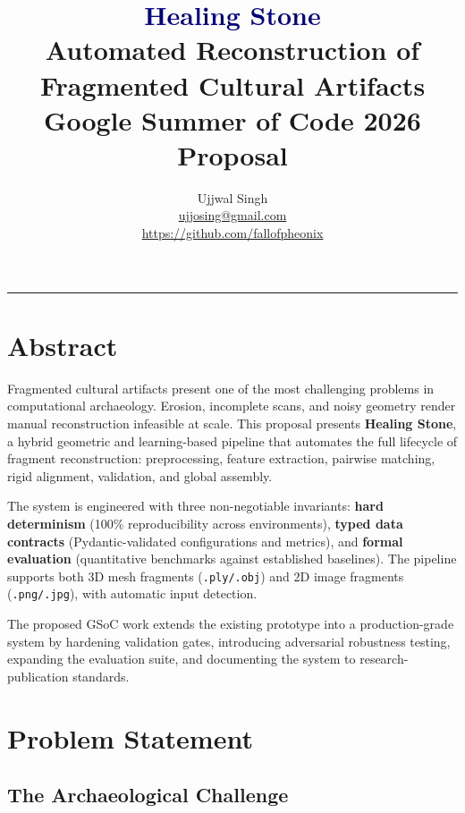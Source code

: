 \documentclass[11pt,a4paper]{article}
\title{
    \vspace{-1cm}
    {\Huge\textbf{\textcolor{navy}{Healing Stone}}} \\[0.3cm]
    {\Large Automated Reconstruction of Fragmented Cultural Artifacts} \\[0.3cm]
    {\large Google Summer of Code 2026 Proposal}
}
\author{
    Ujjwal Singh \\
    \href{mailto:ujjosing@gmail.com}{ujjosing@gmail.com} \\
    \url{https://github.com/fallofpheonix}
}
\date{}
\begin{document}
\maketitle
\thispagestyle{fancy}

\vspace{-0.5cm}
\begin{center}
\rule{0.8\textwidth}{0.5pt}
\end{center}

\tableofcontents
\newpage

\section{Abstract}

Fragmented cultural artifacts present one of the most challenging problems in computational archaeology. Erosion, incomplete scans, and noisy geometry render manual reconstruction infeasible at scale. This proposal presents \textbf{Healing Stone}, a hybrid geometric and learning-based pipeline that automates the full lifecycle of fragment reconstruction: preprocessing, feature extraction, pairwise matching, rigid alignment, validation, and global assembly.

The system is engineered with three non-negotiable invariants: \textbf{hard determinism} (100\% reproducibility across environments), \textbf{typed data contracts} (Pydantic-validated configurations and metrics), and \textbf{formal evaluation} (quantitative benchmarks against established baselines). The pipeline supports both 3D mesh fragments (\texttt{.ply/.obj}) and 2D image fragments (\texttt{.png/.jpg}), with automatic input detection.

The proposed GSoC work extends the existing prototype into a production-grade system by hardening validation gates, introducing adversarial robustness testing, expanding the evaluation suite, and documenting the system to research-publication standards.

\section{Problem Statement}

\subsection{The Archaeological Challenge}
\end{document}
